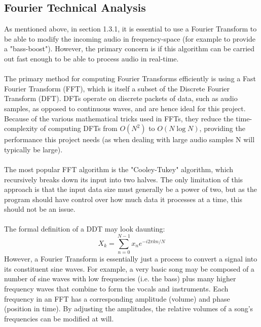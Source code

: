 \pagebreak
\subsection{Fourier Technical Analysis}
As mentioned above, in section 1.3.1, it is essential to use a Fourier Transform to be able to modify the incoming audio in frequency-space (for example to provide a "bass-boost"). However, the primary concern is if this algorithm can be carried out fast enough to be able to process audio in real-time.

\paragraph{}
The primary method for computing Fourier Transforms efficiently is using a Fast Fourier Transform (FFT), which is itself a subset of the Discrete Fourier Transform (DFT). DFTs operate on discrete packets of data, such as audio samples, as opposed to continuous waves, and are hence ideal for this project. Because of the various mathematical tricks used in FFTs, they reduce the time-complexity of computing DFTs from \(O(N^2)\) to \(O(N\log{N})\), providing the performance this project needs (as when dealing with large audio samples N will typically be large).

\paragraph{}
The most popular FFT algorithm is the "Cooley-Tukey" algorithm, which recursively breaks down its input into two halves. The only limitation of  this approach is that the input data size must generally be a power of two, but as the program should have control over how much data it processes at a time, this should not be an issue.

\paragraph{}
The formal definition of a DDT may look daunting:
\[
X_k = \sum_{n=0}^{N-1} x_n e^{-i2\pi k n/N}
\]
However, a Fourier Transform is essentially just a process to convert a signal into its constituent sine waves. For example, a very basic song may be composed of a number of sine waves with low frequencies (i.e. the bass) plus many higher frequency waves that combine to form the vocals and instruments. Each frequency in an FFT has a corresponding amplitude (volume) and phase (position in time). By adjusting the amplitudes, the relative volumes of a song's frequencies can be modified at will.


